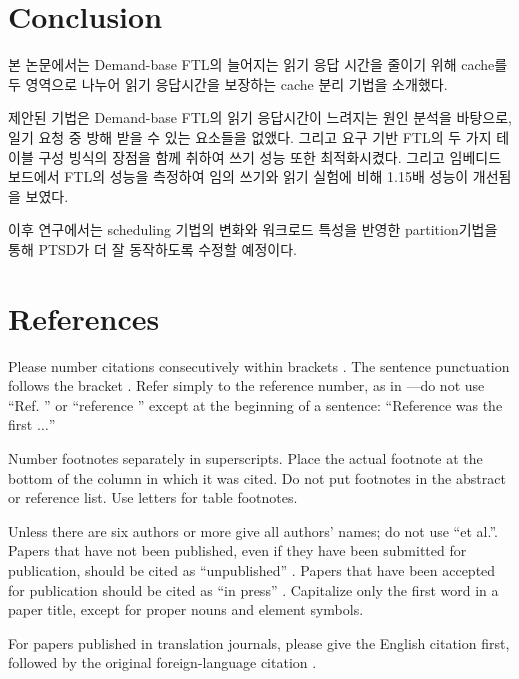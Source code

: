\documentclass[conference]{IEEEtran}
\begin{document}
\section{Conclusion}
본 논문에서는 Demand-base FTL의 늘어지는 읽기 응답 시간을 줄이기 위해 cache를 두 영역으로 나누어 
읽기 응답시간을 보장하는 cache 분리 기법을 소개했다. \par

제안된 기법은 Demand-base FTL의 읽기 응답시간이 느려지는 원인 분석을 바탕으로, 일기 요청 중 방해 
받을 수 있는 요소들을 없앴다. 그리고 요구 기반 FTL의 두 가지 테이블 구성 빙식의 장점을 함께 취하여
쓰기 성능 또한 최적화시켰다. 그리고 임베디드 보드에서 FTL의 성능을 측정하여 임의 쓰기와 읽기 
실험에 비해 1.15배 성능이 개선됨을 보였다.\par

이후 연구에서는 scheduling 기법의 변화와 워크로드 특성을 반영한 partition기법을 통해 PTSD가 더 
잘 동작하도록 수정할 예정이다.

\section*{References}

Please number citations consecutively within brackets \cite{b1}. The 
sentence punctuation follows the bracket \cite{b2}. Refer simply to the reference 
number, as in \cite{b3}---do not use ``Ref. \cite{b3}'' or ``reference \cite{b3}'' except at 
the beginning of a sentence: ``Reference \cite{b3} was the first $\ldots$''

Number footnotes separately in superscripts. Place the actual footnote at 
the bottom of the column in which it was cited. Do not put footnotes in the 
abstract or reference list. Use letters for table footnotes.

Unless there are six authors or more give all authors' names; do not use 
``et al.''. Papers that have not been published, even if they have been 
submitted for publication, should be cited as ``unpublished'' \cite{b4}. Papers 
that have been accepted for publication should be cited as ``in press'' \cite{b5}. 
Capitalize only the first word in a paper title, except for proper nouns and 
element symbols.

For papers published in translation journals, please give the English 
citation first, followed by the original foreign-language citation \cite{b6}.
\end{document}

